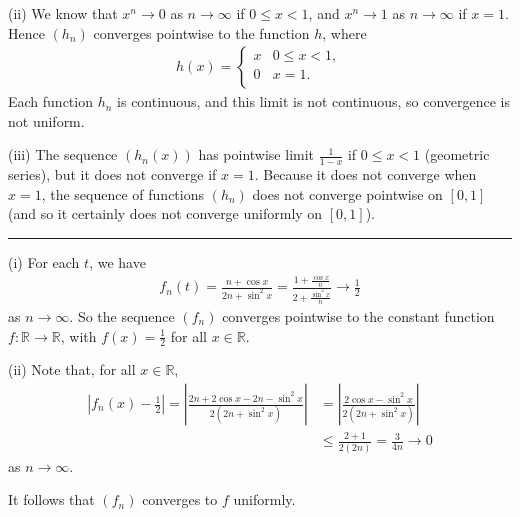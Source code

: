 \documentclass[letterpaper,10pt,english]{jupyterBook}
\begin{document}
\sphinxAtStartPar
(ii) We know that \(x^n \rightarrow 0\) as \(n\rightarrow \infty\) if \(0\leq x<1\), and \(x^n\rightarrow 1\) as \(n\rightarrow \infty\) if \(x=1\). Hence \((h_n)\) converges pointwise to the function \(h\), where
\begin{equation*}
\begin{split}
h (x) =\left\{ \begin{array}{ll}
x & 0\leq x<1, \\
0 & x=1. \\
\end{array} \right.
\end{split}
\end{equation*}
\sphinxAtStartPar
Each function \(h_n\) is continuous, and this limit is not continuous, so convergence is not uniform.

\sphinxAtStartPar
(iii) The sequence \((h_n(x))\) has pointwise limit \(\frac{1}{1-x}\) if \(0\leq x<1\) (geometric series), but it does not converge if \(x=1\). Because it does not converge when \(x=1\), the sequence of functions \((h_n)\) does not converge pointwise  on \([0,1]\) (and so it certainly does not converge uniformly on \([0,1]\)).


\bigskip\hrule\bigskip


\sphinxAtStartPar
{\hyperref[\detokenize{Problems:id58}]{}}
(i) For each \(t\), we have
\begin{equation*}
\begin{split}
f_n(t) = \frac{n+\cos x}{2n+\sin^2 x} = \frac{1+\frac{\cos x}{n}}{2+\frac{\sin^2 x}{n}} \rightarrow \frac{1}{2}
\end{split}
\end{equation*}
\sphinxAtStartPar
as \(n\rightarrow \infty\). So the sequence \((f_n)\) converges pointwise to the constant function \(f:\mathbb{R}\to\mathbb{R}\), with \(f(x)=\frac{1}{2}\) for all \(x\in\mathbb{R}\).

\sphinxAtStartPar
(ii) Note that, for all \(x\in\mathbb{R}\),
\begin{align*}
\left|f_n(x) - \frac{1}{2}\right| =  \left| \frac{2n+2\cos x -2n -\sin^2 x}{2(2n+\sin^2 x)} \right| 
&= \left| \frac{2\cos x -\sin^2 x}{2(2n+\sin^2 x)} \right| \\
&\leq \frac{2+1}{2(2n)}=\frac{3}{4n} \rightarrow 0 
\end{align*}
\sphinxAtStartPar
as \(n\rightarrow \infty\).

It follows that \((f_n)\) converges to \(f\) uniformly.
\end{document}
